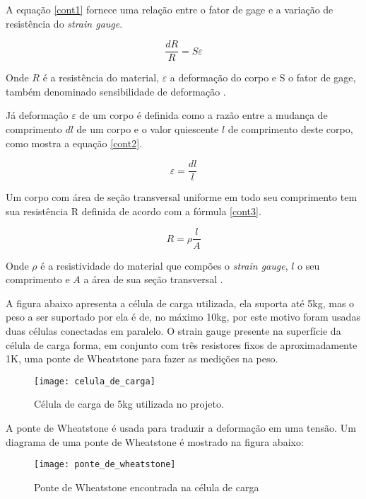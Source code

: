 \pagebreak

A equação \ref{cont1} fornece uma relação entre o fator de gage e a variação de resistência do \textit{strain gauge}.

\begin{equation}
\label{cont1}
\frac{dR}{R}=S \varepsilon
\end{equation}

Onde $R$ é a resistência do material, $\varepsilon$ a deformação do corpo e S o fator de gage, também denominado sensibilidade de deformação \cite{strain}.

Já deformação $\varepsilon$ de um corpo é definida como a razão entre a mudança de comprimento $dl$ de um corpo e o valor quiescente $l$ de comprimento deste corpo, como mostra a equação \ref{cont2}.

\begin{equation}
\label{cont2}
\varepsilon = \frac{dl}{l}
\end{equation}

Um corpo com área de seção transversal uniforme em todo seu comprimento tem sua resistência R definida de acordo com a fórmula \ref{cont3}.

\begin{equation}
\label{cont3}
R=\rho \frac{l}{A}
\end{equation}

Onde $\rho$ é a resistividade do material que compões o \textit{strain gauge}, $l$ o seu comprimento e $A$ a área de sua seção transversal \cite{4785147}.

A figura abaixo apresenta a célula de carga utilizada, ela suporta até 5kg, mas o peso a ser suportado por ela é de, no máximo 10kg, por este motivo foram usadas duas células conectadas em paralelo. O strain gauge presente na superfície da célula de carga forma, em conjunto com três resistores fixos de aproximadamente 1K, uma ponte de Wheatstone para fazer as medições na peso.

\begin{figure}[!h]
\centering \texttt{[image: celula\_de\_carga]}
\caption{Célula de carga de 5kg utilizada no projeto.}
\label{celulacarga}
 \end{figure}

A ponte de Wheatstone é usada para traduzir a deformação em uma tensão. Um diagrama de uma ponte de Wheatstone é mostrado na figura abaixo:

\begin{figure}[!h]
\centering \texttt{[image: ponte\_de\_wheatstone]}
\caption{ Ponte de Wheatstone encontrada na célula de carga}
\label{wheatstone}
 \end{figure}

